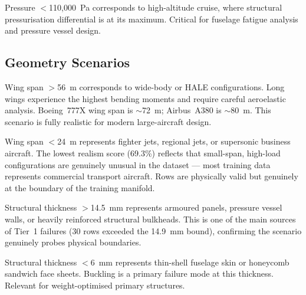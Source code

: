 \documentclass[12pt,a4paper]{article}
\begin{document}
\begin{tcolorbox}[rulebox, title={Pressure Extreme Low (Realism 95.1\%)}]
Pressure $<$110{,}000~Pa corresponds to high-altitude cruise, where structural pressurisation differential is at its maximum. Critical for fuselage fatigue analysis and pressure vessel design.
\end{tcolorbox}

\subsection{Geometry Scenarios}

\begin{tcolorbox}[rulebox, title={Wing Span Extreme Large (Realism 95.7\%)}]
Wing span $>$56~m corresponds to wide-body or HALE configurations. Long wings experience the highest bending moments and require careful aeroelastic analysis. Boeing~777X wing span is $\sim$72~m; Airbus~A380 is $\sim$80~m. This scenario is fully realistic for modern large-aircraft design.
\end{tcolorbox}

\begin{tcolorbox}[rulebox, title={Wing Span Extreme Small (Realism 69.3\%)}]
Wing span $<$24~m represents fighter jets, regional jets, or supersonic business aircraft. The lowest realism score (69.3\%) reflects that small-span, high-load configurations are genuinely unusual in the dataset --- most training data represents commercial transport aircraft. Rows are physically valid but genuinely at the boundary of the training manifold.
\end{tcolorbox}

\begin{tcolorbox}[rulebox, title={Thickness Extreme Thick (Realism 87.3\%)}]
Structural thickness $>$14.5~mm represents armoured panels, pressure vessel walls, or heavily reinforced structural bulkheads. This is one of the main sources of Tier~1 failures (30 rows exceeded the 14.9~mm bound), confirming the scenario genuinely probes physical boundaries.
\end{tcolorbox}

\begin{tcolorbox}[rulebox, title={Thickness Extreme Thin (Realism 83.1\%)}]
Structural thickness $<$6~mm represents thin-shell fuselage skin or honeycomb sandwich face sheets. Buckling is a primary failure mode at this thickness. Relevant for weight-optimised primary structures.
\end{tcolorbox}
\end{document}
